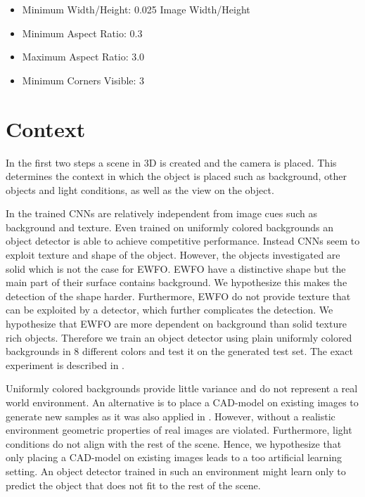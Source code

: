\begin{itemize}
	\item Minimum Width/Height: 0.025 Image Width/Height
	\item Minimum Aspect Ratio: 0.3
	\item Maximum Aspect Ratio: 3.0
	\item Minimum Corners Visible: 3
\end{itemize}

\section{Context}

In the first two steps a scene in 3D is created and the camera is placed. This determines the context in which the object is placed such as background, other objects and light conditions, as well as the view on the object.

In \cite{Peng} the trained \acp{CNN} are relatively independent from image cues such as background and texture. Even trained on uniformly colored backgrounds an object detector is able to achieve competitive performance. Instead \acp{CNN} seem to exploit texture and shape of the object. However, the objects investigated are solid which is not the case for \ac{EWFO}. \ac{EWFO} have a distinctive shape but the main part of their surface contains background. We hypothesize this makes the detection of the shape harder. Furthermore, \ac{EWFO} do not provide texture that can be exploited by a detector, which further complicates the detection. We hypothesize that \ac{EWFO} are more dependent on background than solid texture rich objects. Therefore we train an object detector using plain uniformly colored backgrounds in 8 different colors and test it on the generated test set. The exact experiment is described in .

Uniformly colored backgrounds provide little variance and do not represent a real world environment. An alternative is to place a \ac{CAD}-model on existing images to generate new samples as it was also applied in \cite{Madaan2017, Peng}.  However, without a realistic environment geometric properties of real images are violated. Furthermore, light conditions do not align with the rest of the scene. Hence, we hypothesize that only placing a \ac{CAD}-model on existing images leads to a too artificial learning setting. An object detector trained in such an environment might learn only to predict the object that does not fit to the rest of the scene.

